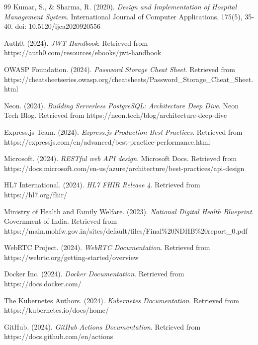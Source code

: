 \begin{thebibliography}{99}
Kumar, S., \& Sharma, R. (2020). \textit{Design and Implementation of Hospital Management System}. International Journal of Computer Applications, 175(5), 35-40. doi: 10.5120/ijca2020920556

Auth0. (2024). \textit{JWT Handbook}. Retrieved from https://auth0.com/resources/ebooks/jwt-handbook

OWASP Foundation. (2024). \textit{Password Storage Cheat Sheet}. Retrieved from https://cheatsheetseries.owasp.org/cheatsheets/Password_Storage_Cheat_Sheet.html

Neon. (2024). \textit{Building Serverless PostgreSQL: Architecture Deep Dive}. Neon Tech Blog. Retrieved from https://neon.tech/blog/architecture-deep-dive

Express.js Team. (2024). \textit{Express.js Production Best Practices}. Retrieved from https://expressjs.com/en/advanced/best-practice-performance.html

Microsoft. (2024). \textit{RESTful web API design}. Microsoft Docs. Retrieved from https://docs.microsoft.com/en-us/azure/architecture/best-practices/api-design

HL7 International. (2024). \textit{HL7 FHIR Release 4}. Retrieved from https://hl7.org/fhir/

Ministry of Health and Family Welfare. (2023). \textit{National Digital Health Blueprint}. Government of India. Retrieved from https://main.mohfw.gov.in/sites/default/files/Final\%20NDHB\%20report_0.pdf

WebRTC Project. (2024). \textit{WebRTC Documentation}. Retrieved from https://webrtc.org/getting-started/overview

Docker Inc. (2024). \textit{Docker Documentation}. Retrieved from https://docs.docker.com/

The Kubernetes Authors. (2024). \textit{Kubernetes Documentation}. Retrieved from https://kubernetes.io/docs/home/

GitHub. (2024). \textit{GitHub Actions Documentation}. Retrieved from https://docs.github.com/en/actions


\end{thebibliography}
